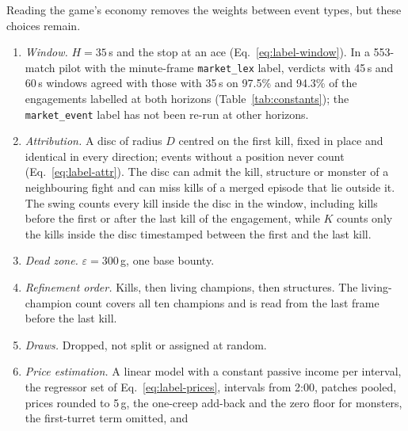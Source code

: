 Reading the game's economy removes the weights between event types, but these choices remain.
\begin{enumerate}
\item \emph{Window.} $H = 35$\,s and the stop at an ace (Eq.~\eqref{eq:label-window}). In a 553-match
  pilot with the minute-frame \texttt{market\_lex} label, verdicts with 45\,s and 60\,s windows agreed
  with those with 35\,s on 97.5\% and 94.3\% of the engagements labelled at both horizons
  (Table~\ref{tab:constants}); the \texttt{market\_event} label has not been re-run at other horizons.
\item \emph{Attribution.} A disc of radius $D$ centred on the first kill, fixed in place and identical
  in every direction; events without a position never count (Eq.~\eqref{eq:label-attr}). The disc can
  admit the kill, structure or monster of a neighbouring fight and can miss kills of a merged episode
  that lie outside it. The swing counts every kill inside the disc in the window, including kills
  before the first or after the last kill of the engagement, while $K$ counts only the kills inside
  the disc timestamped between the first and the last kill.
\item \emph{Dead zone.} $\varepsilon = 300$\,g, one base bounty.
\item \emph{Refinement order.} Kills, then living champions, then structures. The living-champion
  count covers all ten champions and is read from the last frame before the last kill.
\item \emph{Draws.} Dropped, not split or assigned at random.
\item \emph{Price estimation.} A linear model with a constant passive income per interval, the
  regressor set of Eq.~\eqref{eq:label-prices}, intervals from 2:00, patches pooled, prices rounded
  to 5\,g, the one-creep add-back and the zero floor for monsters, the first-turret term omitted, and

\end{enumerate}
